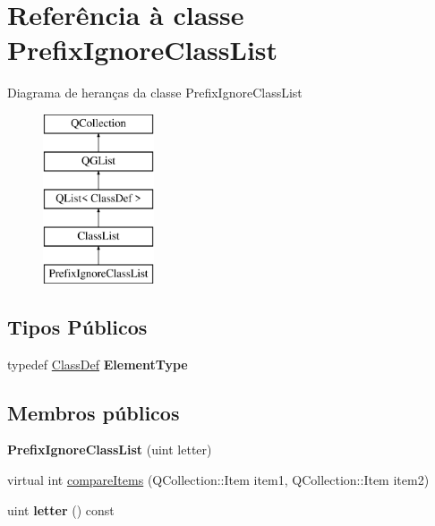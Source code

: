 \hypertarget{class_prefix_ignore_class_list}{\section{Referência à classe Prefix\-Ignore\-Class\-List}
\label{class_prefix_ignore_class_list}
}
Diagrama de heranças da classe Prefix\-Ignore\-Class\-List\begin{figure}[H]
\begin{center}
\leavevmode
\includegraphics[height=5.000000cm]{class_prefix_ignore_class_list}
\end{center}
\end{figure}
\subsection*{Tipos Públicos}
\begin{DoxyCompactItemize}
\item 
\hypertarget{class_prefix_ignore_class_list_a054299b212916c5ac584a6e93b0009ef}{typedef \hyperlink{class_class_def}{Class\-Def} {\bfseries Element\-Type}}\label{class_prefix_ignore_class_list_a054299b212916c5ac584a6e93b0009ef}

\end{DoxyCompactItemize}
\subsection*{Membros públicos}
\begin{DoxyCompactItemize}
\item 
\hypertarget{class_prefix_ignore_class_list_a20c5d5fd24d6e581b072b793b7e7e949}{{\bfseries Prefix\-Ignore\-Class\-List} (uint letter)}\label{class_prefix_ignore_class_list_a20c5d5fd24d6e581b072b793b7e7e949}

\item 
virtual int \hyperlink{class_prefix_ignore_class_list_aade9045d8c0047e0427d8c6a9c048985}{compare\-Items} (Q\-Collection\-::\-Item item1, Q\-Collection\-::\-Item item2)
\item 
\hypertarget{class_prefix_ignore_class_list_ada472040436550156c7064317abe8caa}{uint {\bfseries letter} () const }\label{class_prefix_ignore_class_list_ada472040436550156c7064317abe8caa}

\end{DoxyCompactItemize}
